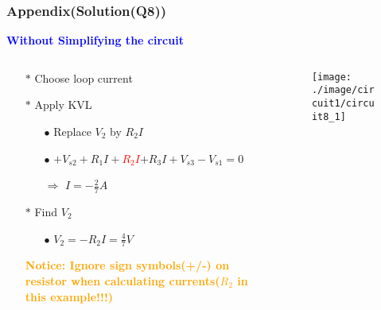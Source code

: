 \documentclass{beamer}
\newcommand{\blue}[1]{\textcolor{blue}{#1}}
\newcommand{\red}[1]{\textcolor{red}{#1}}
\newcommand{\orange}[1]{\textcolor{orange}{#1}}
\begin{document}

\begin{frame}
\frametitle{Appendix(Solution(Q8))}
\blue{{\bf Without Simplifying the circuit}}

\begin{columns}
\begin{column}{7cm}
\begin{itemize} \itemsep1pt \parskip0pt 
  \item[$\ast$] Choose loop current
  \item[$\ast$] Apply KVL
  \begin{itemize} \itemsep1pt \parskip0pt 
    \item[$\bullet$] Replace $V_2$ by $R_2I$
    \item[$\bullet$] $+V_{s2} + R_1I +$\red{$ R_2I$}$ + R_3I + V_{s3} - V_{s1} = 0$
    \item[$\Rightarrow$] $I = -\frac{2}{7}A$
  \end{itemize}
  \item[$\ast$] Find $V_2$
  \begin{itemize} \itemsep1pt \parskip0pt 
    \item[$\bullet$] $V_2 = -R_2I = \frac{4}{7}V$
  \end{itemize}
  \vspace{8 mm}
  \item[] \orange{{\bf Notice: Ignore sign symbols(+/-) on resistor when calculating currents($R_2$ in this example!!!)}}
\end{itemize}
\end{column}

\begin{column}{5cm}
\begin{figure}[H]
  \centering
  \texttt{[image: ./image/circuit1/circuit8\_1]}
\end{figure}
\end{column}



\end{columns}


\end{frame}

\end{document}
